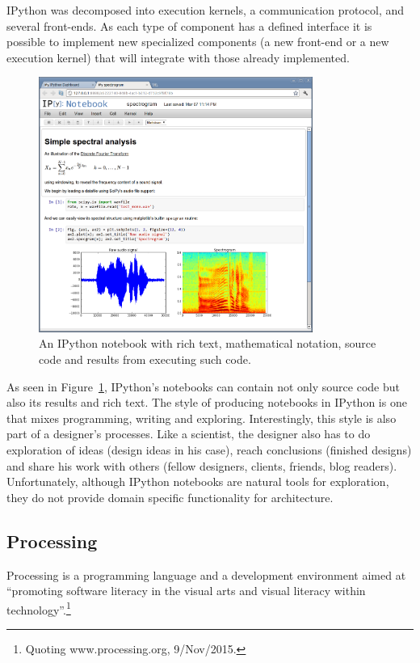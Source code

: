 IPython was decomposed into execution kernels, a communication protocol, and several front-ends.
As each type of component has a defined interface it is possible to implement new specialized components (a new front-end or a new execution kernel) that will integrate with those already implemented.

\begin{figure}
	\centering
	\includegraphics[width=0.8\textwidth]{images/ipython_notebook}
	\caption{An IPython notebook with rich text, mathematical notation, source code and results from executing such code.}
	\label{fig:ipython:notebook}
\end{figure}

As seen in Figure~\ref{fig:ipython:notebook}, IPython's notebooks can contain not only source code but also its results and rich text.
The style of producing notebooks in IPython is one that mixes programming, writing and exploring.
Interestingly, this style is also part of a designer's processes.
Like a scientist, the designer also has to do exploration of ideas (design ideas in his case), reach conclusions (finished designs) and share his work with others (fellow designers, clients, friends, blog readers).
Unfortunately, although IPython notebooks are natural tools for exploration, they do not provide domain specific functionality for architecture.


\subsection{Processing}
\label{section:processing:related}
Processing\cite{reas2007processing} is a programming language and a development environment aimed at ``promoting software literacy in the visual arts and visual literacy within technology''.\footnote{Quoting www.processing.org, 9/Nov/2015.}


